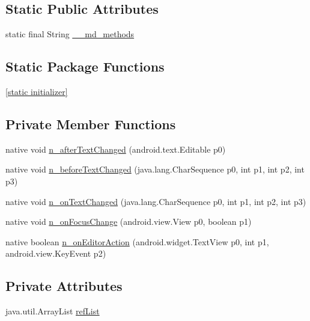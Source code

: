 \subsection*{Static Public Attributes}
\begin{CompactItemize}
\item 
static final String \hyperlink{classmd5b60ffeb829f638581ab2bb9b1a7f4f3f_1_1_entry_cell_view_58b79ef4732c97fcac8b0839aabf25e6}{\_\-\_\-md\_\-methods}
\end{CompactItemize}
\subsection*{Static Package Functions}
\begin{CompactItemize}
\item 
\hyperlink{classmd5b60ffeb829f638581ab2bb9b1a7f4f3f_1_1_entry_cell_view_c5195e962af41644714b2efc9306742e}{\mbox{[}static initializer\mbox{]}}
\end{CompactItemize}
\subsection*{Private Member Functions}
\begin{CompactItemize}
\item 
native void \hyperlink{classmd5b60ffeb829f638581ab2bb9b1a7f4f3f_1_1_entry_cell_view_e7edff3f42c61efac2657a90a7cf0456}{n\_\-afterTextChanged} (android.text.Editable p0)
\item 
native void \hyperlink{classmd5b60ffeb829f638581ab2bb9b1a7f4f3f_1_1_entry_cell_view_34d243c449e7bc60206e9b8d88e03613}{n\_\-beforeTextChanged} (java.lang.CharSequence p0, int p1, int p2, int p3)
\item 
native void \hyperlink{classmd5b60ffeb829f638581ab2bb9b1a7f4f3f_1_1_entry_cell_view_db254e0b3f357d3371ec0461e12da0b2}{n\_\-onTextChanged} (java.lang.CharSequence p0, int p1, int p2, int p3)
\item 
native void \hyperlink{classmd5b60ffeb829f638581ab2bb9b1a7f4f3f_1_1_entry_cell_view_b98a6bd62810173fd88534cb64ea87df}{n\_\-onFocusChange} (android.view.View p0, boolean p1)
\item 
native boolean \hyperlink{classmd5b60ffeb829f638581ab2bb9b1a7f4f3f_1_1_entry_cell_view_d39763bac685bdb01bc26ba3eedca6aa}{n\_\-onEditorAction} (android.widget.TextView p0, int p1, android.view.KeyEvent p2)
\end{CompactItemize}
\subsection*{Private Attributes}
\begin{CompactItemize}
\item 
java.util.ArrayList \hyperlink{classmd5b60ffeb829f638581ab2bb9b1a7f4f3f_1_1_entry_cell_view_7768036a1df03e5a8aa5d75e1c5de7f6}{refList}
\end{CompactItemize}


